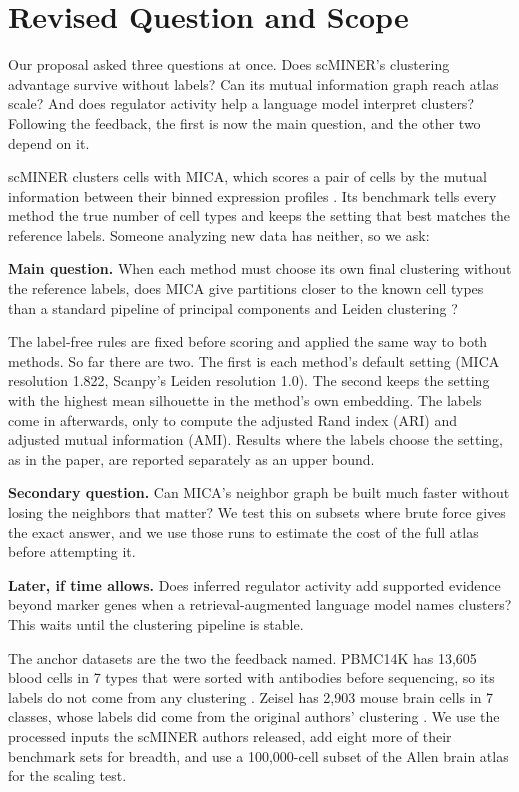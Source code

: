 \section{Revised Question and Scope}\label{sec:question}
Our proposal asked three questions at once. Does scMINER's clustering advantage survive without labels? Can its mutual information graph reach atlas scale? And does regulator activity help a language model interpret clusters? Following the feedback, the first is now the main question, and the other two depend on it.

scMINER clusters cells with MICA, which scores a pair of cells by the mutual information between their binned expression profiles \cite{pan2025scminer}. Its benchmark tells every method the true number of cell types and keeps the setting that best matches the reference labels. Someone analyzing new data has neither, so we ask:

\textbf{Main question.} When each method must choose its own final clustering without the reference labels, does MICA give partitions closer to the known cell types than a standard pipeline of principal components and Leiden clustering \cite{traag2019louvain}?

The label-free rules are fixed before scoring and applied the same way to both methods. So far there are two. The first is each method's default setting (MICA resolution 1.822, Scanpy's Leiden resolution 1.0). The second keeps the setting with the highest mean silhouette in the method's own embedding. The labels come in afterwards, only to compute the adjusted Rand index (ARI) and adjusted mutual information (AMI). Results where the labels choose the setting, as in the paper, are reported separately as an upper bound.

\textbf{Secondary question.} Can MICA's neighbor graph be built much faster without losing the neighbors that matter? We test this on subsets where brute force gives the exact answer, and we use those runs to estimate the cost of the full atlas before attempting it.

\textbf{Later, if time allows.} Does inferred regulator activity add supported evidence beyond marker genes when a retrieval-augmented language model names clusters? This waits until the clustering pipeline is stable.

The anchor datasets are the two the feedback named. PBMC14K has 13,605 blood cells in 7 types that were sorted with antibodies before sequencing, so its labels do not come from any clustering \cite{zheng2017massively}. Zeisel has 2,903 mouse brain cells in 7 classes, whose labels did come from the original authors' clustering \cite{zeisel2015cell}. We use the processed inputs the scMINER authors released, add eight more of their benchmark sets for breadth, and use a 100,000-cell subset of the Allen brain atlas \cite{yao2023allen} for the scaling test.
